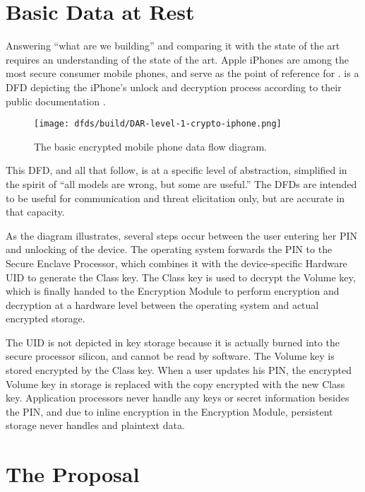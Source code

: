 \modelend


\section{Basic Data at Rest}
\label{sec-basic-dar}

Answering ``what are we building'' and comparing it with the state of the art requires an understanding of the state of
the art. Apple iPhones are among the most secure consumer mobile phones, and serve as the point of reference for
\ldawmsR.  is a \ac{DFD} depicting the iPhone's unlock and decryption process according to their
public documentation \cite{apple_2020}.

\begin{figure}[h]
    \centering\CaptionFontSize
    \texttt{[image: dfds/build/DAR-level-1-crypto-iphone.png]}
    \caption{The basic encrypted mobile phone data flow diagram.}
    \label{fig-dfd-iphone}
\end{figure}

This \ac{DFD}, and all that follow, is at a specific level of abstraction, simplified in the spirit of ``all models are
wrong, but some are useful.'' The \acp{DFD} are intended to be useful for communication and threat elicitation only, but
are accurate in that capacity.

As the diagram illustrates, several steps occur between the user entering her \ac{PIN} and unlocking of the device. The
operating system forwards the \ac{PIN} to the Secure Enclave Processor, which combines it with the device-specific
Hardware \ac{UID} to generate the Class key. The Class key is used to decrypt the Volume key, which is finally handed to
the Encryption Module to perform encryption and decryption at a hardware level between the operating system and actual
encrypted storage.

The \ac{UID} is not depicted in key storage because it is actually burned into the secure processor silicon, and cannot
be read by software. The Volume key is stored encrypted by the Class key. When a user updates his \ac{PIN}, the
encrypted Volume key in storage is replaced with the copy encrypted with the new Class key. Application processors never
handle any keys or secret information besides the \ac{PIN}, and due to inline encryption in the Encryption Module,
persistent storage never handles and \ac{plaintext} data.


\section{The \ldawmsr Proposal}

